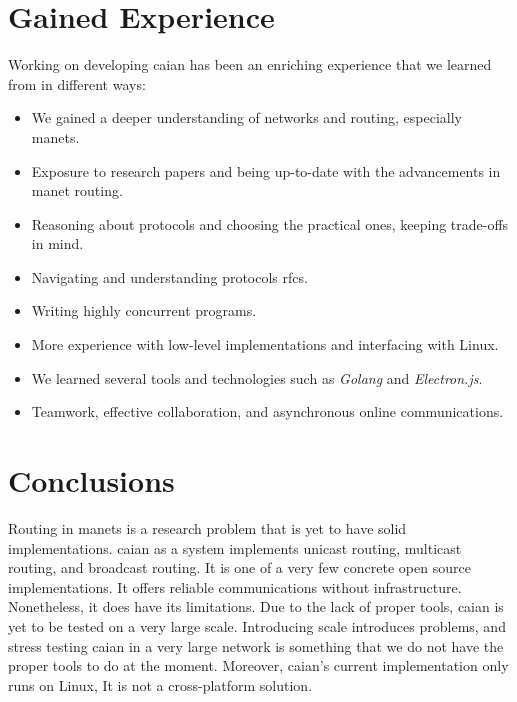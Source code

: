 \section{Gained Experience}

Working on developing \acrshort{caian} has been an enriching experience that we learned from in different ways:
\begin{itemize}[itemsep=1pt, topsep=5pt]
    \item We gained a deeper understanding of networks and routing, especially \acrshort{manets}.
    \item Exposure to research papers and being up-to-date with the advancements in \acrshort{manet} routing.
    \item Reasoning about protocols and choosing the practical ones, keeping trade-offs in mind.
    \item Navigating and understanding protocols \acrshort{rfc}s.
    \item Writing highly concurrent programs.
    \item More experience with low-level implementations and interfacing with Linux.
    \item We learned several tools and technologies such as \textit{Golang} and \textit{Electron.js}. 
    \item Teamwork, effective collaboration, and asynchronous online communications.
\end{itemize}
\section{Conclusions}

Routing in \acrshort{manets} is a research problem that is yet to have solid implementations. \acrshort{caian} as a system implements unicast routing, multicast routing, and broadcast routing. It is one of a very few concrete open source implementations. It offers reliable communications without infrastructure. Nonetheless, it does have its limitations. Due to the lack of proper tools, \acrshort{caian} is yet to be tested on a very large scale. Introducing scale introduces problems, and stress testing \acrshort{caian} in a very large network is something that we do not have the proper tools to do at the moment. Moreover, \acrshort{caian}'s current implementation only runs on Linux, It is not a cross-platform solution. 

